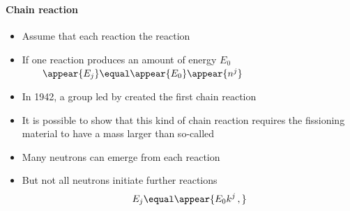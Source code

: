 \begin{frame}
\frametitle{\texorpdfstring{\culine[\sectiontitleulinecolor]{\sectiontitle}}{\sectiontitle} }
\framesubtitle{Chain reaction}

\seminormal
\begin{itemize}[itemsep=1.9mm]
	\item Assume that each reaction  the reaction 
	
	\item If one reaction produces an amount of energy $E_{0}$
$ \qquad
\appear{E_{j}}  \equal \appear{E_{0}} \appear{n^{j}}
$

\item In 1942, a group led by  created the first chain reaction 

\item It is possible to show that this kind of chain reaction requires the fissioning material to have a mass larger than so-called  

\item Many neutrons can emerge from each reaction 

\item But not all neutrons initiate further reactions 
\[
E_{j}  \equal \appear{E_{0} k^{j} \,,} 
\]
\end{itemize}


\endofslide 
\end{frame}

